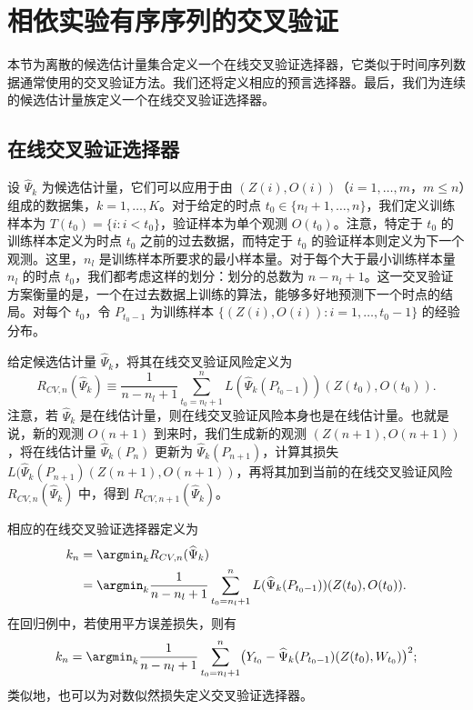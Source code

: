\section{相依实验有序序列的交叉验证}

本节为离散的候选估计量集合定义一个在线交叉验证选择器，它类似于时间序列数据通常使用的交叉验证方法。我们还将定义相应的预言选择器。最后，我们为连续的候选估计量族定义一个在线交叉验证选择器。

\subsection{在线交叉验证选择器}

设 $\widehat\Psi_k$ 为候选估计量，它们可以应用于由 $(Z(i),O(i))$（$i=1,\ldots,m$，$m\le n$）组成的数据集，$k=1,\ldots,K$。对于给定的时点 $t_0\in\{n_l+1,\ldots,n\}$，我们定义训练样本为 $T(t_0)=\{i:i<t_0\}$，验证样本为单个观测 $O(t_0)$。注意，特定于 $t_0$ 的训练样本定义为时点 $t_0$ 之前的过去数据，而特定于 $t_0$ 的验证样本则定义为下一个观测。这里，$n_l$ 是训练样本所要求的最小样本量。对于每个大于最小训练样本量 $n_l$ 的时点 $t_0$，我们都考虑这样的划分：划分的总数为 $n-n_l+1$。这一交叉验证方案衡量的是，一个在过去数据上训练的算法，能够多好地预测下一个时点的结局。对每个 $t_0$，令 $P_{t_0-1}$ 为训练样本 $\{(Z(i),O(i)):i=1,\ldots,t_0-1\}$ 的经验分布。

给定候选估计量 $\widehat\Psi_k$，将其在线交叉验证风险定义为
\[
 R_{CV,n}(\widehat\Psi_k)
 \equiv\frac{1}{n-n_l+1}\sum_{t_0=n_l+1}^{n}
 L(\widehat\Psi_k(P_{t_0-1}))(Z(t_0),O(t_0)).
\]
注意，若 $\widehat\Psi_k$ 是在线估计量，则在线交叉验证风险本身也是在线估计量。也就是说，新的观测 $O(n+1)$ 到来时，我们生成新的观测 $(Z(n+1),O(n+1))$，将在线估计量 $\widehat\Psi_k(P_n)$ 更新为 $\widehat\Psi_k(P_{n+1})$，计算其损失 $L(\widehat\Psi_k(P_{n+1})(Z(n+1),O(n+1))$，再将其加到当前的在线交叉验证风险 $R_{CV,n}(\widehat\Psi_k)$ 中，得到 $R_{CV,n+1}(\widehat\Psi_k)$。

相应的在线交叉验证选择器定义为
\[
 \begin{aligned}
 k_n&=\argmin_k R_{CV,n}(\widehat\Psi_k)\\
 &=\argmin_k\frac{1}{n-n_l+1}\sum_{t_0=n_l+1}^{n}
 L(\widehat\Psi_k(P_{t_0-1}))(Z(t_0),O(t_0)).
 \end{aligned}
\]
在回归例中，若使用平方误差损失，则有
\[
 k_n=\argmin_k\frac{1}{n-n_l+1}\sum_{t_0=n_l+1}^{n}
 \bigl(Y_{t_0}-\widehat\Psi_k(P_{t_0-1})(Z(t_0),W_{t_0})\bigr)^2;
\]
类似地，也可以为对数似然损失定义交叉验证选择器。

